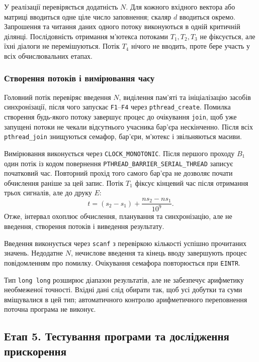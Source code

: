 \documentclass[12pt,a4paper]{article}
\begin{document}
У реалізації перевіряється додатність $N$. Для кожного вхідного вектора
або матриці вводиться одне ціле число заповнення; скаляр $d$ вводиться
окремо. Запрошення та читання даних одного потоку виконуються в одній
критичній ділянці. Послідовність отримання м’ютекса потоками
$T_1,T_2,T_3$ не фіксується, але їхні діалоги не перемішуються. Потік
$T_4$ нічого не вводить, проте бере участь у всіх обчислювальних етапах.

\subsubsection*{Створення потоків і вимірювання часу}

Головний потік перевіряє введення $N$, виділення пам’яті та
ініціалізацію засобів синхронізації, після чого запускає
\texttt{F1}--\texttt{F4} через \texttt{pthread\_create}.
Помилка створення будь-якого потоку завершує процес до очікування
\texttt{join}, щоб уже запущені потоки не чекали відсутнього учасника
бар’єра нескінченно. Після всіх \texttt{pthread\_join} знищуються
семафор, бар’єри, м’ютекс і звільняються масиви.

Вимірювання виконується через \texttt{CLOCK\_MONOTONIC}.
Після першого проходу $B_1$ один потік із кодом повернення
\texttt{PTHREAD\_BARRIER\_SERIAL\_THREAD} записує початковий час.
Повторний прохід того самого бар’єра не дозволяє почати обчислення
раніше за цей запис. Потік $T_1$ фіксує кінцевий час після отримання
трьох сигналів, але до друку $E$:
\begin{equation}
 t=(s_2-s_1)+\frac{ns_2-ns_1}{10^9}.
\end{equation}
Отже, інтервал охоплює обчислення, планування та синхронізацію,
але не введення, створення потоків і виведення результату.

Введення виконується через \texttt{scanf} з перевіркою кількості
успішно прочитаних значень. Недодатне $N$, нечислове введення та кінець
вводу завершують процес повідомленням про помилку. Очікування семафора
повторюється при \texttt{EINTR}.

Тип \texttt{long long} розширює діапазон результатів, але не забезпечує
арифметику необмеженої точності. Вхідні дані слід обирати так, щоб усі
добутки та суми вміщувалися в цей тип; автоматичного контролю
арифметичного переповнення поточна програма не виконує.

\subsection{Етап 5. Тестування програми та дослідження прискорення}
\end{document}
